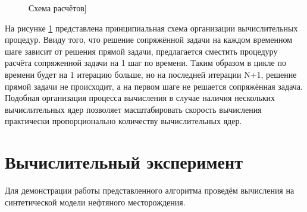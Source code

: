 \documentclass[14pt]{article}
\begin{document}
\begin{figure}
	\caption{Схема расчётов]}
	\label{fig:chem}
\end{figure}
На рисунке \ref{fig:chem} представлена принципиальная схема организации вычислительных процедур. Ввиду того, что решение сопряжённой задачи на каждом временном шаге зависит от решения прямой задачи, предлагается сместить процедуру расчёта сопряженной задачи на 1 шаг по времени. Таким образом в цикле по времени будет на 1 итерацию больше, но на последней итерации N+1, решение прямой задачи не происходит, а на первом шаге не решается сопряжённая задача. Подобная организация процесса вычисления в случае наличия нескольких вычислительных ядер позволяет масштабировать скорость вычисления практически пропорционально количеству вычислительных ядер. 
\section{Вычислительный эксперимент}
Для демонстрации работы представленного алгоритма проведём вычисления на синтетической модели нефтяного месторождения.
\end{document}

